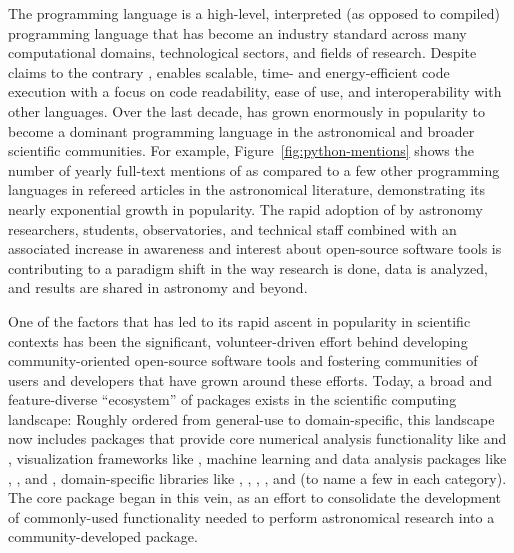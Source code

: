 \documentclass[modern]{aastex631}
\begin{document}
The \python programming language is a high-level, interpreted (as opposed to
compiled) programming language that has become an industry standard across many
computational domains, technological sectors, and fields of research.
Despite claims to the contrary \citep{Portegies-Zwart:2020}, \python enables
scalable, time- and energy-efficient code execution \citep[e.g.,][]{Augier:2021}
with a focus on code readability, ease of use, and interoperability with other
languages.
Over the last decade, \python has grown enormously in popularity to become a
dominant programming language in the astronomical and broader scientific
communities.
For example, Figure~\ref{fig:python-mentions} shows the number of yearly
full-text mentions of \python as compared to a few other programming languages
in refereed articles in the astronomical literature, demonstrating its nearly
exponential growth in popularity.
The rapid adoption of \python by astronomy researchers, students, observatories,
and technical staff combined with an associated increase in awareness and
interest about open-source software tools is contributing to a paradigm shift in
the way research is done, data is analyzed, and results are shared in astronomy
and beyond.

One of the factors that has led to its rapid ascent in popularity in scientific
contexts has been the significant, volunteer-driven effort behind developing
community-oriented open-source software tools and fostering communities of users
and developers that have grown around these efforts.
Today, a broad and feature-diverse ``ecosystem'' of packages exists in the
\python scientific computing landscape: Roughly ordered from general-use to
domain-specific, this landscape now includes packages that provide core
numerical analysis functionality like  \citep{numpy:nature} and
 \citep{scipy}, visualization frameworks like
 \citep{matplotlib}, machine learning and data analysis
packages like  \citep{tensorflow}, 
\citep{Salvatier:2016}, and  \citep{emcee}, domain-specific
libraries like  \citep{yt:2011}, 
\citep{plasmapy},  \citep{sunpy:apj}, 
\citep{biopython}, and  \citep{sympy} (to name a few in each
category).
The \astropypkg \citep{astropy:2013, astropy:2018} core package began in this
vein, as an effort to consolidate the development of commonly-used functionality
needed to perform astronomical research into a community-developed \python
package.
\end{document}
